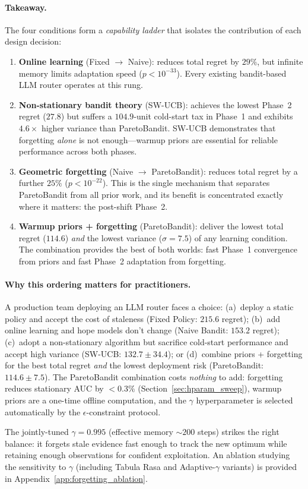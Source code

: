\paragraph{Takeaway.}
The four conditions form a \emph{capability ladder} that
isolates the contribution of each design decision:
\begin{enumerate}[nosep,leftmargin=*]
  \item \textbf{Online learning} (Fixed $\to$ Naive):
    reduces total regret by $29\%$, but infinite memory limits
    adaptation speed ($p < 10^{-33}$).
    Every existing bandit-based LLM router operates at this
    rung.
  \item \textbf{Non-stationary bandit theory} (SW-UCB):
    achieves the lowest Phase~2 regret ($27.8$) but suffers
    a $104.9$-unit cold-start tax in Phase~1 and exhibits
    $4.6\times$ higher variance than ParetoBandit.
    SW-UCB demonstrates that forgetting \emph{alone} is not
    enough---warmup priors are essential for reliable
    performance across both phases.
  \item \textbf{Geometric forgetting} (Naive $\to$ ParetoBandit):
    reduces total regret by a further $25\%$ ($p < 10^{-22}$).
    This is the single mechanism that separates ParetoBandit from
    all prior work, and its benefit is concentrated exactly where
    it matters: the post-shift Phase~2.
  \item \textbf{Warmup priors + forgetting} (ParetoBandit):
    deliver the lowest total regret ($114.6$) \emph{and} the
    lowest variance ($\sigma{=}7.5$) of any learning condition.
    The combination provides the best of both worlds: fast
    Phase~1 convergence from priors and fast Phase~2 adaptation
    from forgetting.
\end{enumerate}

\paragraph{Why this ordering matters for practitioners.}
A production team deploying an LLM router faces a choice:
(a)~deploy a static policy and accept the cost of staleness
(Fixed Policy: $215.6$ regret);
(b)~add online learning and hope models don't change
(Naive Bandit: $153.2$ regret);
(c)~adopt a non-stationary algorithm but sacrifice cold-start
performance and accept high variance (SW-UCB: $132.7 \pm 34.4$);
or (d)~combine priors + forgetting for the best total regret
\emph{and} the lowest deployment risk (ParetoBandit:
$114.6 \pm 7.5$).
The ParetoBandit combination costs \emph{nothing} to add:
forgetting reduces stationary AUC by ${<}0.3\%$
(Section~\ref{sec:hparam_sweep}), warmup priors are a one-time
offline computation, and the $\gamma$ hyperparameter is selected
automatically by the $\epsilon$-constraint protocol.

\noindent
The jointly-tuned $\gamma{=}0.995$ (effective memory ${\sim}200$
steps) strikes the right balance: it forgets stale evidence
fast enough to track the new optimum while retaining enough
observations for confident exploitation.
An ablation studying the sensitivity to $\gamma$ (including
Tabula Rasa and Adaptive-$\gamma$ variants) is provided
in Appendix~\ref{app:forgetting_ablation}.
